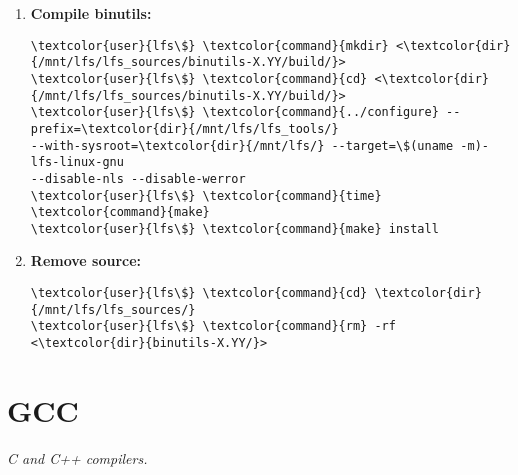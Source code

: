 \documentclass[10pt, a4paper, onecolumn, oneside, titlepage, openany]{book}
\begin{document}
\begin{enumerate}
\begin{Verbatim}[commandchars=\\\{\}]
\textcolor{user}{lfs\$} \textcolor{command}{mv} <\textcolor{file}{binutils-X.YY.tar.xz}> \textcolor{dir}{/mnt/lfs/lfs_sources/}
\textcolor{user}{lfs\$} \textcolor{command}{cd} \textcolor{dir}{/mnt/lfs/lfs_sources/}
\textcolor{user}{lfs\$} \textcolor{command}{tar} xvJf <\textcolor{file}{binutils-X.YY.tar.xz}>
\textcolor{user}{lfs\$} \textcolor{command}{rm} <\textcolor{file}{binutils-X.YY.tar.xz}>
\end{Verbatim}
    \item \textbf{Compile binutils:}
\begin{Verbatim}[commandchars=\\\{\}]
\textcolor{user}{lfs\$} \textcolor{command}{mkdir} <\textcolor{dir}{/mnt/lfs/lfs_sources/binutils-X.YY/build/}>
\textcolor{user}{lfs\$} \textcolor{command}{cd} <\textcolor{dir}{/mnt/lfs/lfs_sources/binutils-X.YY/build/}>
\textcolor{user}{lfs\$} \textcolor{command}{../configure} --prefix=\textcolor{dir}{/mnt/lfs/lfs_tools/}
--with-sysroot=\textcolor{dir}{/mnt/lfs/} --target=\$(uname -m)-lfs-linux-gnu
--disable-nls --disable-werror
\textcolor{user}{lfs\$} \textcolor{command}{time} \textcolor{command}{make}
\textcolor{user}{lfs\$} \textcolor{command}{make} install
\end{Verbatim}
    \item \textbf{Remove source:}
\begin{Verbatim}[commandchars=\\\{\}]
\textcolor{user}{lfs\$} \textcolor{command}{cd} \textcolor{dir}{/mnt/lfs/lfs_sources/}
\textcolor{user}{lfs\$} \textcolor{command}{rm} -rf <\textcolor{dir}{binutils-X.YY/}>
\end{Verbatim}
\end{enumerate}

\section{GCC}
\textit{C and C++ compilers.}
\end{document}
